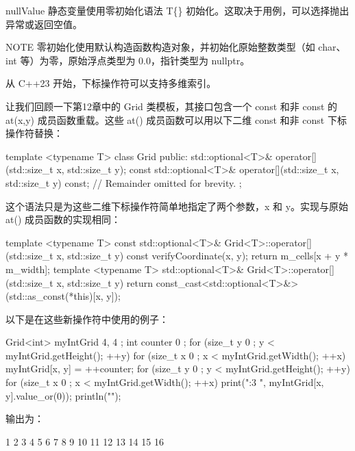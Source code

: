 nullValue 静态变量使用零初始化语法 T\{\} 初始化。这取决于用例，可以选择抛出异常或返回空值。

\begin{myNotic}{NOTE}
零初始化使用默认构造函数构造对象，并初始化原始整数类型（如 char、int 等）为零，原始浮点类型为 0.0，指针类型为 nullptr。
\end{myNotic}



从 C++23 开始，下标操作符可以支持多维索引。

让我们回顾一下第12章中的 Grid 类模板，其接口包含一个 const 和非 const 的 at(x,y) 成员函数重载。这些 at() 成员函数可以用以下二维 const 和非 const 下标操作符替换：

\begin{cpp}
template <typename T>
class Grid
{
    public:
        std::optional<T>& operator[](std::size_t x, std::size_t y);
        const std::optional<T>& operator[](std::size_t x, std::size_t y) const;
        // Remainder omitted for brevity.
};
\end{cpp}

这个语法只是为这些二维下标操作符简单地指定了两个参数，x 和 y。实现与原始 at() 成员函数的实现相同：

\begin{cpp}
template <typename T>
const std::optional<T>& Grid<T>::operator[](std::size_t x, std::size_t y) const
{
    verifyCoordinate(x, y);
    return m_cells[x + y * m_width];
}
template <typename T>
std::optional<T>& Grid<T>::operator[](std::size_t x, std::size_t y)
{
    return const_cast<std::optional<T>&>(std::as_const(*this)[x, y]);
}
\end{cpp}

以下是在这些新操作符中使用的例子：

\begin{cpp}
Grid<int> myIntGrid { 4, 4 };
int counter { 0 };
for (size_t y { 0 }; y < myIntGrid.getHeight(); ++y) {
    for (size_t x { 0 }; x < myIntGrid.getWidth(); ++x) {
        myIntGrid[x, y] = ++counter;
    }
}
for (size_t y { 0 }; y < myIntGrid.getHeight(); ++y) {
    for (size_t x { 0 }; x < myIntGrid.getWidth(); ++x) {
        print("{:3} ", myIntGrid[x, y].value_or(0));
    }
    println("");
}
\end{cpp}

输出为：

\begin{shell}
 1  2  3  4
 5  6  7  8
 9 10 11 12
13 14 15 16
\end{shell}


